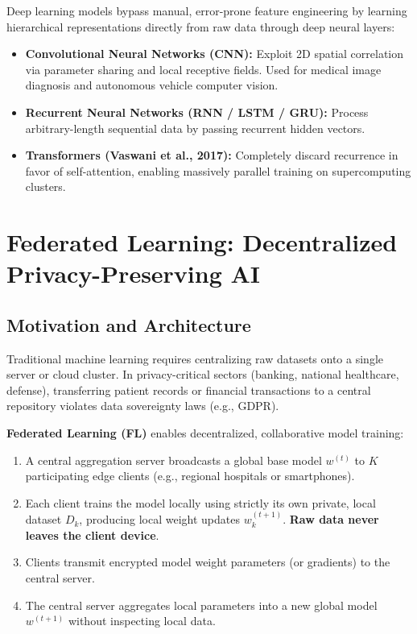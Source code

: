 Deep learning models bypass manual, error-prone feature engineering by learning hierarchical representations directly from raw data through deep neural layers:
\begin{itemize}
    \item \textbf{Convolutional Neural Networks (CNN):} Exploit 2D spatial correlation via parameter sharing and local receptive fields. Used for medical image diagnosis and autonomous vehicle computer vision.
    \item \textbf{Recurrent Neural Networks (RNN / LSTM / GRU):} Process arbitrary-length sequential data by passing recurrent hidden vectors.
    \item \textbf{Transformers (Vaswani et al., 2017):} Completely discard recurrence in favor of self-attention, enabling massively parallel training on supercomputing clusters.
\end{itemize}


\section{Federated Learning: Decentralized Privacy-Preserving AI}
\label{sec:federated_learning}

\subsection{Motivation and Architecture}
Traditional machine learning requires centralizing raw datasets onto a single server or cloud cluster. In privacy-critical sectors (banking, national healthcare, defense), transferring patient records or financial transactions to a central repository violates data sovereignty laws (e.g., GDPR).

\textbf{Federated Learning (FL)} enables decentralized, collaborative model training:
\begin{enumerate}
    \item A central aggregation server broadcasts a global base model $w^{(t)}$ to $K$ participating edge clients (e.g., regional hospitals or smartphones).
    \item Each client trains the model locally using strictly its own private, local dataset $D_k$, producing local weight updates $w_k^{(t+1)}$. \textbf{Raw data never leaves the client device}.
    \item Clients transmit encrypted model weight parameters (or gradients) to the central server.
    \item The central server aggregates local parameters into a new global model $w^{(t+1)}$ without inspecting local data.
\end{enumerate}

